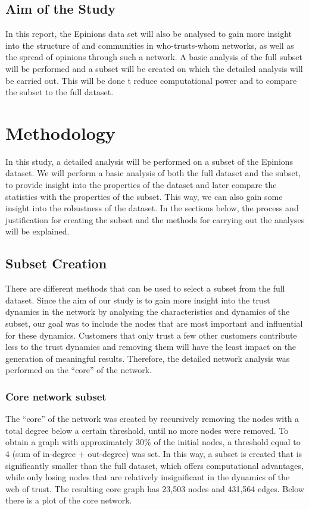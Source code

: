 \documentclass[conference]{IEEEtran}
\begin{document}
\subsection{Aim of the Study}
In this report, the Epinions data set will also be analysed to gain more insight into the structure of and communities in who-trusts-whom networks, as well as the spread of opinions through such a network. A basic analysis of the full subset will be performed and a subset will be created on which the detailed analysis will be carried out. This will be done t reduce computational power and to compare the subset to the full dataset. 

\section{Methodology}

In this study, a detailed analysis will be performed on a subset of the Epinions dataset. We will perform a basic analysis of both the full dataset and the subset, to provide insight into the properties of the dataset and later compare the statistics with the properties of the subset. This way, we can also gain some insight into the robustness of the dataset. In the sections below, the process and justification for creating the subset and the methods for carrying out the analyses will be explained. 

\subsection{Subset Creation}
There are different methods that can be used to select a subset from the full dataset. Since the aim of our study is to gain more insight into the trust dynamics in the network by analysing the characteristics and dynamics of the subset, our goal was to include the nodes that are most important and influential for these dynamics. Customers that only trust a few other customers contribute less to the trust dynamics and removing them will have the least impact on the generation of meaningful results. Therefore, the detailed network analysis was performed on the “core” of the network. 

\subsubsection{Core network subset}
The “core” of the network was created by recursively removing the nodes with a total degree below a certain threshold, until no more nodes were removed. To obtain a graph with approximately 30\% of the initial nodes, a threshold equal to 4 (sum of in-degree + out-degree) was set. In this way, a subset is created that is significantly smaller than the full dataset, which offers computational advantages, while only losing nodes that are relatively insignificant in the dynamics of the web of trust. The resulting core graph has 23,503 nodes and 431,564 edges. Below there is a plot of the core network.
\end{document}
